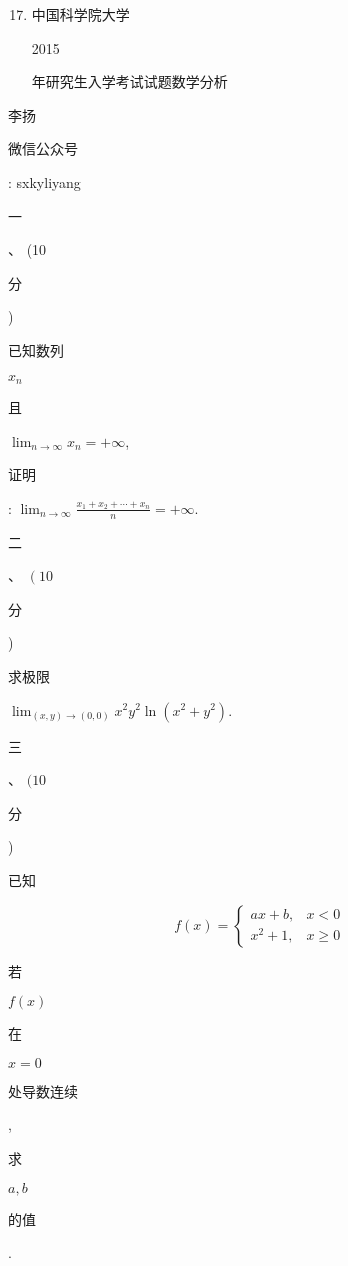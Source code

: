 \documentclass[10pt]{article}
\begin{document}
\begin{enumerate}
  \setcounter{enumi}{16}
  \item \begin{CJK}{UTF8}{mj}中国科学院大学\end{CJK} 2015 \begin{CJK}{UTF8}{mj}年研究生入学考试试题数学分析\end{CJK}
\end{enumerate}
\begin{CJK}{UTF8}{mj}李扬\end{CJK}

\begin{CJK}{UTF8}{mj}微信公众号\end{CJK}: sxkyliyang

\begin{CJK}{UTF8}{mj}一\end{CJK}、 (10 \begin{CJK}{UTF8}{mj}分\end{CJK}) \begin{CJK}{UTF8}{mj}已知数列\end{CJK} $x_{n}$ \begin{CJK}{UTF8}{mj}且\end{CJK} $\lim _{n \rightarrow \infty} x_{n}=+\infty$, \begin{CJK}{UTF8}{mj}证明\end{CJK}: $\lim _{n \rightarrow \infty} \frac{x_{1}+x_{2}+\cdots+x_{n}}{n}=+\infty$.

\begin{CJK}{UTF8}{mj}二\end{CJK}、 $\left(10\right.$ \begin{CJK}{UTF8}{mj}分\end{CJK}) \begin{CJK}{UTF8}{mj}求极限\end{CJK} $\lim _{(x, y) \rightarrow(0,0)} x^{2} y^{2} \ln \left(x^{2}+y^{2}\right)$.

\begin{CJK}{UTF8}{mj}三\end{CJK}、 $(10$ \begin{CJK}{UTF8}{mj}分\end{CJK}) \begin{CJK}{UTF8}{mj}已知\end{CJK}
$$
f(x)= \begin{cases}a x+b, & x<0 \\ x^{2}+1, & x \geq 0\end{cases}
$$
\begin{CJK}{UTF8}{mj}若\end{CJK} $f(x)$ \begin{CJK}{UTF8}{mj}在\end{CJK} $x=0$ \begin{CJK}{UTF8}{mj}处导数连续\end{CJK}, \begin{CJK}{UTF8}{mj}求\end{CJK} $a, b$ \begin{CJK}{UTF8}{mj}的值\end{CJK}.
\end{document}
